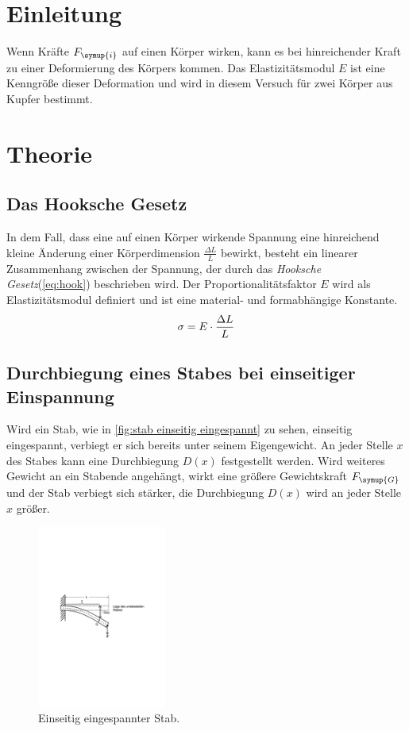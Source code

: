 \section{Einleitung}
Wenn Kräfte $F_{\symup{i}}$ auf einen Körper wirken, kann es bei hinreichender Kraft zu einer Deformierung des Körpers kommen.
Das Elastizitätsmodul $E$ ist eine Kenngröße dieser Deformation und wird in diesem Versuch für zwei Körper aus Kupfer bestimmt.

\section{Theorie}
\label{sec:Theorie}

\subsection{Das Hooksche Gesetz}
\label{sec:hook}
In dem Fall, dass eine auf einen Körper wirkende Spannung eine hinreichend kleine Änderung einer Körperdimension 
$\frac{\Delta L}{L}$ bewirkt, besteht ein linearer Zusammenhang zwischen der Spannung, der durch das 
\textit{Hooksche Gesetz}(\autoref{eq:hook}) beschrieben wird. Der Proportionalitätsfaktor $E$ wird als Elastizitätsmodul 
definiert und ist eine material- und formabhängige Konstante.
\begin{equation}
    \sigma = E \cdot \frac{\Delta L} {L} \notag
    \label{eq:hook}
\end{equation}

\subsection{Durchbiegung eines Stabes bei einseitiger Einspannung}
\label{sec:einseitig}
Wird ein Stab, wie in \autoref{fig:stab einseitig eingespannt} zu sehen, einseitig eingespannt, verbiegt er sich bereits 
unter seinem Eigengewicht. An jeder Stelle $x$ des Stabes kann eine Durchbiegung $D(x)$ festgestellt werden.
Wird weiteres Gewicht an ein Stabende angehängt, wirkt eine größere Gewichtskraft $F_{\symup{G}}$ und der Stab 
verbiegt sich stärker, die Durchbiegung $D(x)$ wird an jeder Stelle $x$ größer.
\begin{figure}
    \centering
    \includegraphics[height=6cm]{content/Abbildungen/stab_einseitig_eingespannt.pdf}
    \caption{Einseitig eingespannter Stab. \cite{v103}}
    \label{fig:stab einseitig eingespannt}
\end{figure}

